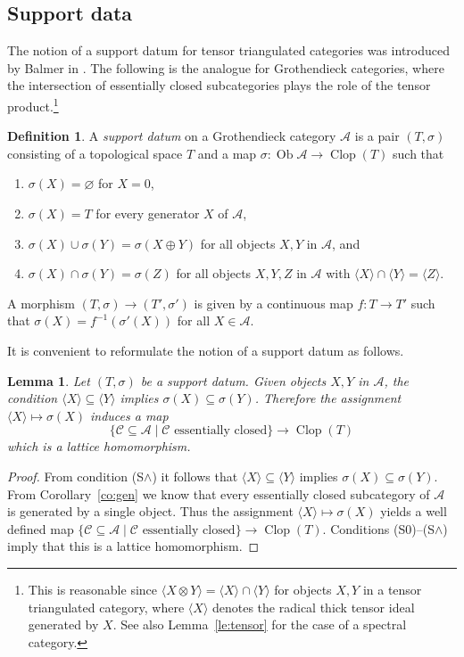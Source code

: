 \documentclass[a4paper]{amsart}
\theoremstyle{plain}
\newtheorem{lem}[thm]{Lemma}
\theoremstyle{definition}
\newtheorem{defn}[thm]{Definition}
\theoremstyle{remark}
\numberwithin{equation}{section}
\newcommand{\Clop}{\operatorname{Clop}}
\newcommand{\Ob}{\operatorname{Ob}}
\newcommand{\lto}{\longrightarrow}
\def\A{\mathcal A}
\def\C{\mathcal C}
\def\s{\sigma}
\begin{document}
\subsection*{Support data}

The notion of a support datum for tensor triangulated categories was
introduced by Balmer in \cite{Ba2005}. The following is the analogue
for Grothendieck categories, where the intersection of essentially closed
subcategories plays the role of the tensor product.\footnote{This is
  reasonable since $\langle X\otimes Y\rangle=\langle X\rangle\cap
  \langle Y\rangle$ for objects $X,Y$ in a tensor triangulated
  category, where $\langle X\rangle$ denotes the radical thick tensor
  ideal generated by $X$. See also Lemma~\ref{le:tensor} for the
case of a spectral category.}

\begin{defn}\label{de:support}
A \emph{support datum} on a Grothendieck category $\A$ is a pair
$(T,\s)$ consisting of a topological space $T$ and a map
$\s\colon\Ob\A\to \Clop(T)$ such that
\begin{enumerate}
\item[(S$0$)] $\s(X)=\varnothing$ for $X=0$,
\item[(S$1$)] $\s(X)=T$ for every generator $X$ of $\A$,
\item[(S$\vee$)] $\s(X)\cup\s(Y)=\s(X\oplus Y)$ for all objects $X,Y$ in
  $\A$, and
\item[(S$\wedge$)] $\s(X)\cap\s(Y)=\s(Z)$ for all objects $X,Y,Z$ in $\A$
  with $\langle X\rangle\cap \langle Y\rangle=\langle Z\rangle$.
\end{enumerate}
A morphism $(T,\s)\to (T',\s')$ is given by a continuous map $f\colon
T\to T'$ such that $\s(X)=f^{-1}(\s'(X))$ for all $X\in\A$.
\end{defn}

It is convenient to reformulate the notion of a support datum as follows.
\begin{lem}\label{le:support-hom}
Let $(T,\s)$ be a support datum. Given objects $X,Y$ in $\A$, the
condition  $\langle X\rangle\subseteq\langle Y\rangle$ implies $\s(X)\subseteq
\s(Y)$.
Therefore the assignment $\langle X\rangle\mapsto\s(X)$ induces a map
\[\{\C\subseteq\A\mid \C\text{ essentially closed}\}\lto\Clop(T)\]
which is a lattice homomorphism.
\end{lem}
\begin{proof}
  From condition (S$\wedge$) it follows that
  $\langle X\rangle\subseteq\langle Y\rangle$ implies
  $\s(X)\subseteq \s(Y)$.  From Corollary~\ref{co:gen} we know that
  every essentially closed subcategory of $\A$ is generated by a single
  object. Thus the assignment $\langle X\rangle\mapsto\s(X)$ yields a
  well defined map
  $\{\C\subseteq\A\mid \C\text{ essentially closed}\}\to\Clop(T)$.  Conditions
  (S$0$)--(S$\wedge$) imply that this is a lattice homomorphism.
\end{proof}
\end{document}
